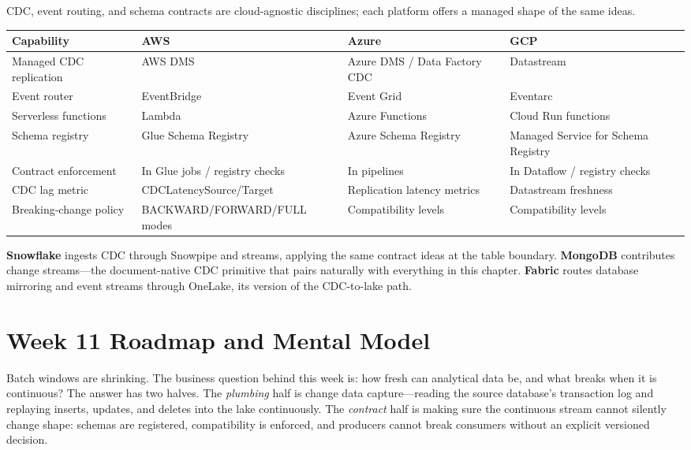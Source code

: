 \begin{crosscloud}
CDC, event routing, and schema contracts are cloud-agnostic disciplines; each platform offers a managed shape of the same ideas.

\vspace{2mm}
{\footnotesize
\begin{tabular}{@{}p{2.8cm}p{3.0cm}p{3.0cm}p{3.0cm}@{}}
\toprule
\textbf{Capability} & \textbf{AWS} & \textbf{Azure} & \textbf{GCP} \\
\midrule
Managed CDC replication & AWS DMS & Azure DMS / Data Factory CDC & Datastream \\
Event router & EventBridge & Event Grid & Eventarc \\
Serverless functions & Lambda & Azure Functions & Cloud Run functions \\
Schema registry & Glue Schema Registry & Azure Schema Registry & Managed Service for Schema Registry \\
Contract enforcement & In Glue jobs / registry checks & In pipelines & In Dataflow / registry checks \\
\addlinespace
CDC lag metric & CDCLatencySource/Target & Replication latency metrics & Datastream freshness \\
Breaking-change policy & BACKWARD/FORWARD/FULL modes & Compatibility levels & Compatibility levels \\
\bottomrule
\end{tabular}}

\vspace{1mm}
\textbf{Snowflake} ingests CDC through Snowpipe and streams, applying the same contract ideas at the table boundary. \textbf{MongoDB} contributes change streams---the document-native CDC primitive that pairs naturally with everything in this chapter. \textbf{Fabric} routes database mirroring and event streams through OneLake, its version of the CDC-to-lake path.
\end{crosscloud}

\section{Week 11 Roadmap and Mental Model}
Batch windows are shrinking. The business question behind this week is: how fresh can analytical data be, and what breaks when it is continuous? The answer has two halves. The \emph{plumbing} half is change data capture---reading the source database's transaction log and replaying inserts, updates, and deletes into the lake continuously. The \emph{contract} half is making sure the continuous stream cannot silently change shape: schemas are registered, compatibility is enforced, and producers cannot break consumers without an explicit versioned decision.

